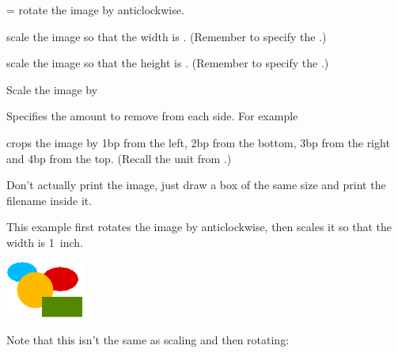 \begin{fwlist}{=   }
 rotate the image
by  anticlockwise.

 scale the image so that the
width is .  (Remember to specify the
.)

  scale the image so that the
height is .  (Remember to specify the
.)

 Scale the image by 

  Specifies
the amount to remove from each side.  For example
\begin{codeS}
\end{codeS}
crops the image by 1bp from the left, 2bp from the bottom, 3bp from
the right and 4bp from the top. (Recall the  unit
from .)\reportpagebreak

  Don't actually print the image, just draw a
box of the same size and print the filename inside it. 

\end{fwlist}


This example first rotates the image by  anticlockwise,
then scales it so that the width is 1~inch.

\begin{codeS}
\end{codeS}

\begin{resultS}
\includegraphics[angle=45,width=1in]{exercises/shapes}
\end{resultS}

Note that this isn't the same as scaling and then rotating:
\begin{codeS}
\end{codeS}

